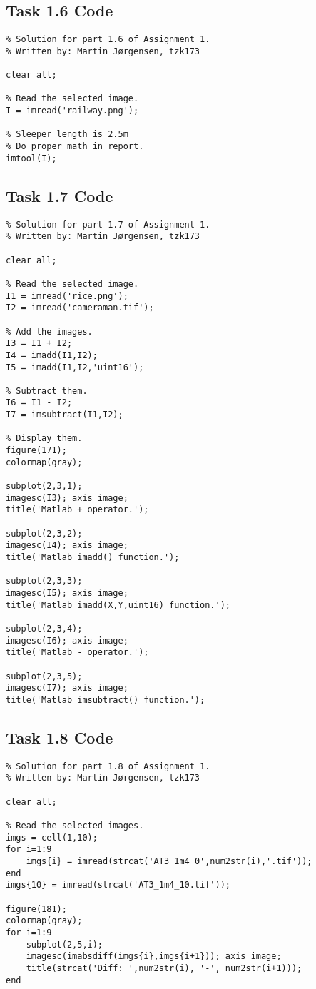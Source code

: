 \subsection{Task 1.6 Code}
\begin{verbatim}
% Solution for part 1.6 of Assignment 1.
% Written by: Martin Jørgensen, tzk173

clear all;

% Read the selected image.
I = imread('railway.png');

% Sleeper length is 2.5m
% Do proper math in report.
imtool(I);
\end{verbatim}

\subsection{Task 1.7 Code}
\begin{verbatim}
% Solution for part 1.7 of Assignment 1.
% Written by: Martin Jørgensen, tzk173

clear all;

% Read the selected image.
I1 = imread('rice.png');
I2 = imread('cameraman.tif');

% Add the images.
I3 = I1 + I2;
I4 = imadd(I1,I2);
I5 = imadd(I1,I2,'uint16');

% Subtract them.
I6 = I1 - I2;
I7 = imsubtract(I1,I2);

% Display them.
figure(171);
colormap(gray);

subplot(2,3,1);
imagesc(I3); axis image;
title('Matlab + operator.');

subplot(2,3,2);
imagesc(I4); axis image;
title('Matlab imadd() function.');

subplot(2,3,3);
imagesc(I5); axis image;
title('Matlab imadd(X,Y,uint16) function.');

subplot(2,3,4);
imagesc(I6); axis image;
title('Matlab - operator.');

subplot(2,3,5);
imagesc(I7); axis image;
title('Matlab imsubtract() function.');
\end{verbatim}

\subsection{Task 1.8 Code}
\begin{verbatim}
% Solution for part 1.8 of Assignment 1.
% Written by: Martin Jørgensen, tzk173

clear all;

% Read the selected images.
imgs = cell(1,10);
for i=1:9
    imgs{i} = imread(strcat('AT3_1m4_0',num2str(i),'.tif'));
end
imgs{10} = imread(strcat('AT3_1m4_10.tif'));

figure(181);
colormap(gray);
for i=1:9
    subplot(2,5,i);
    imagesc(imabsdiff(imgs{i},imgs{i+1})); axis image;
    title(strcat('Diff: ',num2str(i), '-', num2str(i+1)));
end
\end{verbatim}

